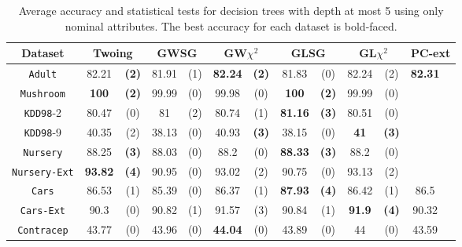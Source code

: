 \begin{table*}[t]
\small
\centering
\caption{Average accuracy and statistical tests  for  decision trees 
with depth at most 5 using only nominal attributes. The best accuracy for each dataset is bold-faced.}
\begin{tabular}{c|cc|cc|cc|cc|cc|cc} 
Dataset & \multicolumn{2}{c|}{Twoing} &  \multicolumn{2}{c|}{GWSG}  
&   \multicolumn{2}{c|}{GW$\chi^2$}                   &\multicolumn{2}{c|}{GLSG}       &\multicolumn{2}{c|}{GL$\chi^2$} & \multicolumn{2}{c}{PC-ext}\\  \hline 
{\tt Adult}         & 82.21    &{\bf(2)}& 81.91    & (1)    &{\bf82.24}&{\bf(2)}& 81.83    & (0)    & 82.24    & (2)    &{\bf82.31}&        \\
{\tt Mushroom}      & {\bf 100}&{\bf(2)}& 99.99    & (0)    & 99.98    & (0)    &{\bf  100}&{\bf(2)}& 99.99    & (0)    &          &        \\
{\tt KDD98}-2       & 80.47    & (0)    & 81       & (2)    & 80.74    & (1)    &{\bf81.16}&{\bf(3)}& 80.51    & (0)    &          &        \\
{\tt KDD98}-9       & 40.35    & (2)    & 38.13    & (0)    & 40.93    &{\bf(3)}& 38.15    & (0)    &{\bf 41 } &{\bf(3)}&          &        \\
{\tt Nursery}       & 88.25    &{\bf(3)}& 88.03    & (0)    & 88.2     & (0)    &{\bf88.33}&{\bf(3)}& 88.2     & (0)    &          &        \\
{\tt Nursery-Ext}   &{\bf93.82}&{\bf(4)}& 90.95    & (0)    & 93.02    & (2)    & 90.75    & (0)    & 93.13    & (2)    &          &        \\
{\tt Cars}          & 86.53    & (1)    & 85.39    & (0)    & 86.37    & (1)    &{\bf87.93}&{\bf(4)}& 86.42    & (1)    & 86.5     &        \\
{\tt Cars-Ext}      & 90.3     & (0)    & 90.82    & (1)    & 91.57    & (3)    & 90.84    & (1)    &{\bf 91.9}&{\bf(4)}& 90.32    &        \\
{\tt Contracep}     & 43.77    & (0)    & 43.96    & (0)    &{\bf44.04}& (0)    & 43.89    & (0)    & 44       & (0)    & 43.59    &        \\

\end{tabular}
\end{table*}
